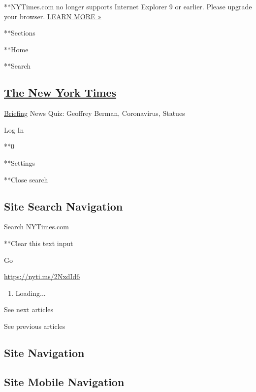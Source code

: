  **NYTimes.com no longer supports Internet Explorer 9 or earlier. Please
upgrade your browser.
\href{http://www.nytimes.com/content/help/site/ie9-support.html}{LEARN
MORE »}

**Sections

**Home

**Search

\hypertarget{the-new-york-times}{%
\subsection{\texorpdfstring{\href{http://www.nytimes.com/}{The New York
Times}}{The New York Times}}\label{the-new-york-times}}


\href{/interactive/2018/briefing/global-morning-briefing-newsletter-signup.html}{Briefing}
\textbar{}News Quiz: Geoffrey Berman, Coronavirus, Statues

Log In

**0

**Settings

**Close search

\hypertarget{site-search-navigation}{%
\subsection{Site Search Navigation}\label{site-search-navigation}}

Search NYTimes.com

**Clear this text input

Go

\url{https://nyti.ms/2NxdId6}

\begin{enumerate}
\def\labelenumi{\arabic{enumi}.}
\item
  Loading...
\end{enumerate}

See next articles

See previous articles

\hypertarget{site-navigation}{%
\subsection{Site Navigation}\label{site-navigation}}

\hypertarget{site-mobile-navigation}{%
\subsection{Site Mobile Navigation}\label{site-mobile-navigation}}

